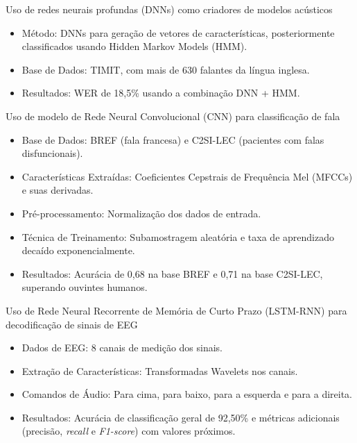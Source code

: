 \documentclass{beamer}
\begin{document}
	\begin{frame}{Uso de redes neurais profundas (DNNs) como criadores de modelos acústicos \cite{6296526}}
		\begin{itemize}
			\item Método: DNNs para geração de vetores de características, posteriormente classificados usando Hidden Markov Models (HMM).
			\item Base de Dados: TIMIT, com mais de 630 falantes da língua inglesa.
			\item Resultados: WER de 18,5\% usando a combinação DNN + HMM.
		\end{itemize}
		
	\end{frame}
	
	\begin{frame}{Uso de modelo de Rede Neural Convolucional (CNN) para classificação de fala \cite{abderrazek20_interspeech}}
		\begin{itemize}
			\item Base de Dados: BREF (fala francesa) e C2SI-LEC (pacientes com falas disfuncionais).
			\item Características Extraídas: Coeficientes Cepstrais de Frequência Mel (MFCCs) e suas derivadas.
			\item Pré-processamento: Normalização dos dados de entrada.
			\item Técnica de Treinamento: Subamostragem aleatória e taxa de aprendizado decaído exponencialmente.
			\item Resultados: Acurácia de 0,68 na base BREF e 0,71 na base C2SI-LEC, superando ouvintes humanos.
		\end{itemize}
		
	\end{frame}

	\begin{frame}{Uso de Rede Neural Recorrente de Memória de Curto Prazo (LSTM-RNN) para decodificação de sinais de EEG \cite{pawar2022wavelet}}
		\begin{itemize}
			\item Dados de EEG: 8 canais de medição dos sinais.
			\item Extração de Características: Transformadas Wavelets nos canais.
			\item Comandos de Áudio: Para cima, para baixo, para a esquerda e para a direita.
			\item Resultados: Acurácia de classificação geral de 92,50\% e métricas adicionais (precisão, \textit{recall} e \textit{F1-score}) com valores próximos.
		\end{itemize}
		
	\end{frame}
	
\end{document}
